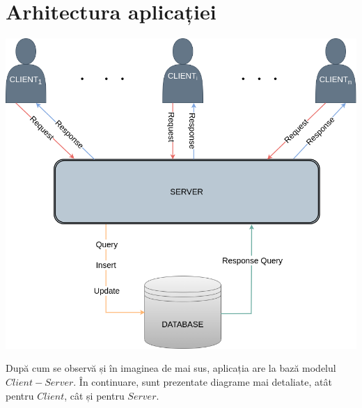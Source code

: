 \documentclass[runningheads]{llncs}
\begin{document}
\section{Arhitectura aplicației}
\begin{center}
\includegraphics[scale=0.4]{diagram.png}
\end{center}
După cum se observă și în imaginea de mai sus, aplicația are la bază modelul $Client-Server$.
În continuare, sunt prezentate diagrame mai detaliate, atât pentru $Client$, cât și pentru $Server$.
\end{document}
